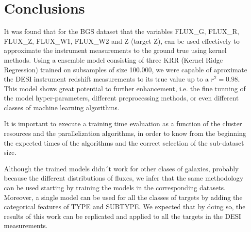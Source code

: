 \chapter{Conclusions}
\label{Ch:conclusion}

It was found that for the BGS dataset that the variables FLUX\_G, FLUX\_R, FLUX\_Z, FLUX\_W1, FLUX\_W2 and Z (target Z), can be used effectively to approximate the instrument measurements to the ground true using kernel methods. Using a ensemble model consisting of three KRR (Kernel Ridge Regression) trained on subsamples of size 100.000, we were capable of aproximate the DESI instrument redshift measurements to its true value up to a $r^2 = 0.98$.  This model shows great potential to further enhancement, i.e. the fine tunning of the model hyper-parameters, different preprocessing methods, or even different classes of machine learning algorithms.

It is important to execute a training time evaluation as a function of the cluster resources and the parallelization algorithms, in order to know from the beginning the expected times of the algorithms and the correct selection of the sub-dataset size.  

Although the trained models didn´t work for other clases of galaxies, probably because the different distributions of fluxes, we infer that the same methodology can be used starting by training the models in the corresponding datasets. Moreover, a single model can be used for all the classes of targets by adding the categorical features of TYPE and SUBTYPE. We expected that by doing so, the results of this work can be replicated and applied to all the targets in the DESI measurements. 
